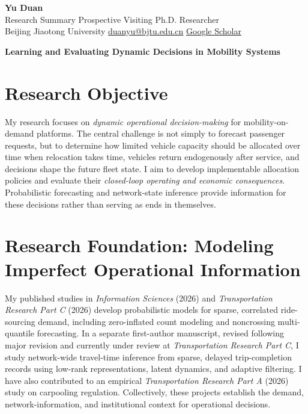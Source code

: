 \documentclass[10pt,letterpaper]{article}
\begin{document}
\begin{center}
{\fontsize{20}{23}\selectfont\bfseries Yu Duan}\\[3pt]
{\small Research Summary \quad\textbar\quad Prospective Visiting Ph.D. Researcher}\\[3pt]
{\small Beijing Jiaotong University \quad\textbar\quad \href{mailto:duanyu@bjtu.edu.cn}{duanyu@bjtu.edu.cn} \quad\textbar\quad \href{https://scholar.google.com/citations?user=pLcJk40AAAAJ}{Google Scholar}}
\end{center}
\vspace{-6pt}
\begin{center}
{\large\bfseries\color{darkblue}Learning and Evaluating Dynamic Decisions in Mobility Systems}
\end{center}
\vspace{-10pt}

\section*{Research Objective}
My research focuses on \emph{dynamic operational decision-making} for mobility-on-demand platforms. The central challenge is not simply to forecast passenger requests, but to determine how limited vehicle capacity should be allocated over time when relocation takes time, vehicles return endogenously after service, and decisions shape the future fleet state. I aim to develop implementable allocation policies and evaluate their \emph{closed-loop operating and economic consequences}. Probabilistic forecasting and network-state inference provide information for these decisions rather than serving as ends in themselves.

\section*{Research Foundation: Modeling Imperfect Operational Information}
My published studies in \emph{Information Sciences} (2026) and \emph{Transportation Research Part C} (2026) develop probabilistic models for sparse, correlated ride-sourcing demand, including zero-inflated count modeling and noncrossing multi-quantile forecasting. In a separate first-author manuscript, revised following major revision and currently under review at \emph{Transportation Research Part C}, I study network-wide travel-time inference from sparse, delayed trip-completion records using low-rank representations, latent dynamics, and adaptive filtering. I have also contributed to an empirical \emph{Transportation Research Part A} (2026) study on carpooling regulation. Collectively, these projects establish the demand, network-information, and institutional context for operational decisions.
\end{document}
